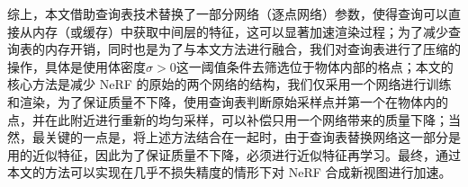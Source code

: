 综上，本文借助查询表技术替换了一部分网络（逐点网络）参数，使得查询可以直接从内存（或缓存）中获取中间层的特征，这可以显著加速渲染过程；为了减少查询表的内存开销，同时也是为了与本文方法进行融合，我们对查询表进行了压缩的操作，具体是使用体密度$\sigma > 0$这一阈值条件去筛选位于物体内部的格点；本文的核心方法是减少 NeRF 的原始的两个网络的结构，我们仅采用一个网络进行训练和渲染，为了保证质量不下降，使用查询表判断原始采样点并第一个在物体内的点，并在此附近进行重新的均匀采样，可以补偿只用一个网络带来的质量下降；当然，最关键的一点是，将上述方法结合在一起时，由于查询表替换网络这一部分是用的近似特征，因此为了保证质量不下降，必须进行近似特征再学习。最终，通过本文的方法可以实现在几乎不损失精度的情形下对 NeRF 合成新视图进行加速。

\cleardoublepage
